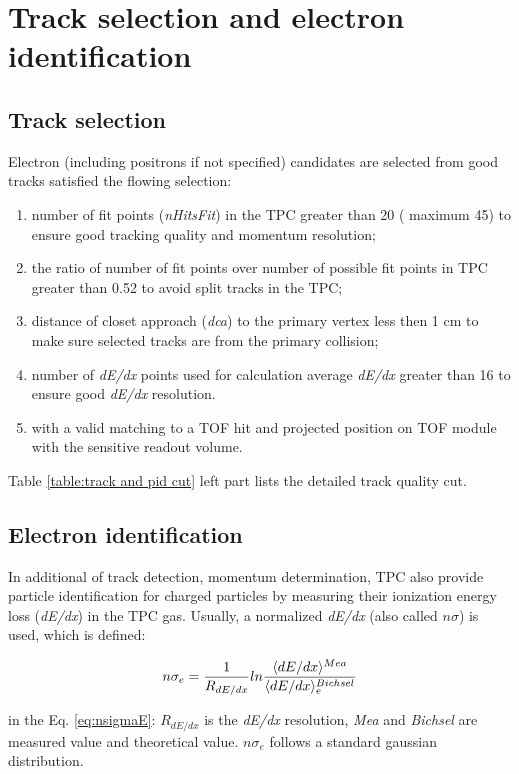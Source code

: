 \section{Track selection and electron identification}


\subsection{Track selection}

Electron (including positrons if not specified) candidates are selected
from good tracks satisfied the flowing selection: 
\begin{enumerate}
\item number of fit points (\emph{nHitsFit}) in the TPC greater than 20
( maximum 45) to ensure good tracking quality and momentum resolution;
\item the ratio of number of fit points over number of possible fit points
in TPC greater than 0.52 to avoid split tracks in the TPC;
\item distance of closet approach (\emph{dca}) to the primary vertex less
then 1 cm to make sure selected tracks are from the primary collision;
\item number of \emph{dE/dx }points used for calculation average \emph{dE/dx
}greater than 16 to ensure good \emph{dE/dx} resolution.
\item with a valid matching to a TOF hit and projected position on TOF module
with the sensitive readout volume. 
\end{enumerate}
Table \ref{table:track and pid cut} left part lists the detailed
track quality cut.


\subsection{Electron identification}

In additional of track detection, momentum determination, TPC also
provide particle identification for charged particles by measuring
their ionization energy loss (\emph{dE/dx}) in the TPC gas. Usually,
a normalized \emph{dE/dx }(also called $n\sigma$) is used, which
is defined:

\begin{equation}
n\sigma_{e}=\frac{1}{R_{dE/dx}}ln\frac{\langle dE/dx\text{\ensuremath{\rangle}}{}^{Mea}}{\langle dE/dx\rangle_{e}^{Bichsel}}\label{eq:nsigmaE}
\end{equation}


in the Eq. \ref{eq:nsigmaE}: $R_{dE/dx}$ is the \emph{dE/dx} resolution,
\emph{Mea }and \emph{Bichsel} are measured value and theoretical value.
$n\sigma_{e}$ follows a standard gaussian distribution. 

